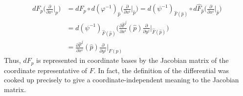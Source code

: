 \begin{align*}
dF_p\Big(\frac{\partial}{\partial x^i}\Big|_p\Big)&=dF_p\circ d(\varphi^{-1})_{\widehat{p}}\Big(\frac{\partial}{\partial x^i}\Big|_{\widehat{p}}\Big)=d(\psi^{-1})_{\widehat{F}(\widehat{p})}\circ d\widehat{F}_{\widehat{p}}\Big(\frac{\partial}{\partial x^i}\Big|_{\widehat{p}}\Big)\\
&=d(\psi^{-1})_{\widehat{F}(\widehat{p})}\Big(\frac{\partial\widehat{F}^j}{\partial x^i}(\widehat{p})\frac{\partial}{\partial y^j}\Big|_{\widehat{F}(\widehat{p})}\Big)\\
&=\frac{\partial\widehat{F}^j}{\partial x^i}(\widehat{p})\frac{\partial}{\partial y^j}\Big|_{F(p)}
\end{align*}
Thus, $dF_p$ is represented in coordinate bases by the Jacobian matrix of the coordinate representative of $F$. In fact, the definition of the differential was cooked up precisely to give a coordinate-independent meaning to the Jacobian matrix.
